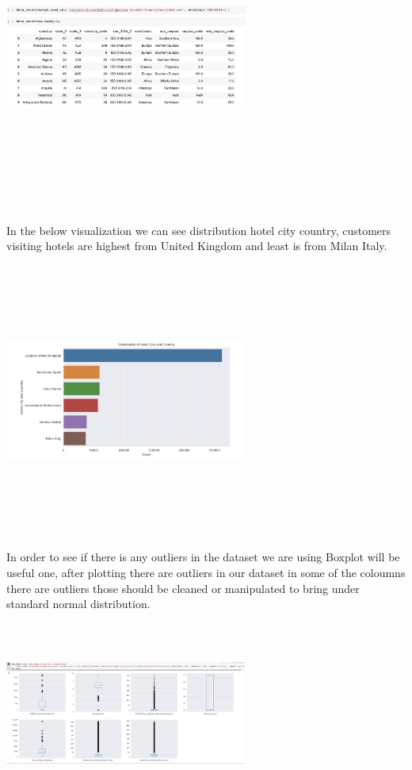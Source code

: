 \includegraphics[width=8cm, height=10cm ]{country.jpeg}

In the below visualization we can see distribution hotel city country, customers visiting hotels are highest from United Kingdom and least is from Milan Italy.

\includegraphics[width=8cm, height=9cm ]{hotelcitycountry.jpeg}

 In order to see if there is any outliers in the dataset we are using Boxplot will be useful one, after plotting there are outliers in our dataset in some of the coloumns there are outliers those should be cleaned or manipulated to bring under standard normal distribution.
 
\includegraphics[width=8cm, height=6cm ]{Boxplot.jpeg}

